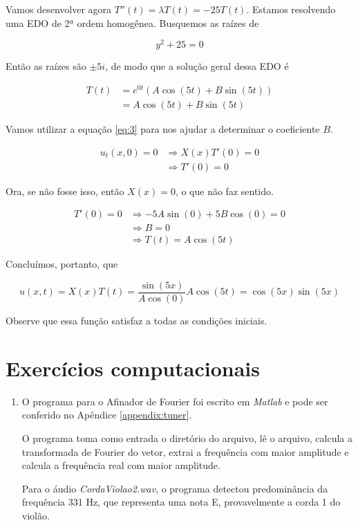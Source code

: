 \documentclass{article}
\begin{document}
\begin{enumerate}
                Vamos desenvolver agora $T''(t) = \lambda T(t) = -25 T(t)$.
                Estamos resolvendo uma EDO de 2ª ordem homogênea. Busquemos as raízes de

                $$y^2+25 = 0$$

                Então as raízes são $\pm 5i$, de modo que a solução geral dessa EDO é

                \begin{align*}
                    T(t) &= e^{0t} (A \cos(5t) + B\sin(5t)) \\
                    &= A \cos(5t) + B\sin(5t)
                \end{align*}

                Vamos utilizar a equação \ref{eq:3} para nos ajudar a determinar o coeficiente $B$.
                
                \begin{align*}
                    u_t(x, 0) = 0 &\Rightarrow X(x) T'(0) = 0 \\
                    &\Rightarrow T'(0) = 0
                \end{align*}

                Ora, se não fosse isso, então $X(x) = 0$, o que não faz sentido.

                \begin{align*}
                    T'(0) = 0 &\Rightarrow -5A \sin(0) + 5B\cos(0) = 0 \\
                    &\Rightarrow B = 0 \\
                    &\Rightarrow T(t) = A \cos(5t)
                \end{align*}

                Concluímos, portanto, que

                $$u(x, t) = X(x)T(t) = \dfrac{\sin(5x)}{A \cos(0)}A \cos(5t) = \cos(5x)\sin(5x)$$

                Observe que essa função satisfaz a todas as condições iniciais.
        \end{enumerate}

    \section*{Exercícios computacionais}

        \begin{enumerate}
            \item O programa para o Afinador de Fourier
                foi escrito em \textit{Matlab} e pode ser conferido
                no Apêndice \ref{appendix:tuner}.

                O programa toma como entrada o diretório do arquivo,
                lê o arquivo, calcula a transformada de Fourier do vetor, extrai
                a frequência com maior amplitude e calcula a frequência real
                com maior amplitude.

                Para o áudio \textit{CordaViolao2.wav}, o programa detectou
                predominância da frequência 331 Hz, que representa uma nota E,
                provavelmente a corda 1 do violão.
        \end{enumerate}
\end{document}
